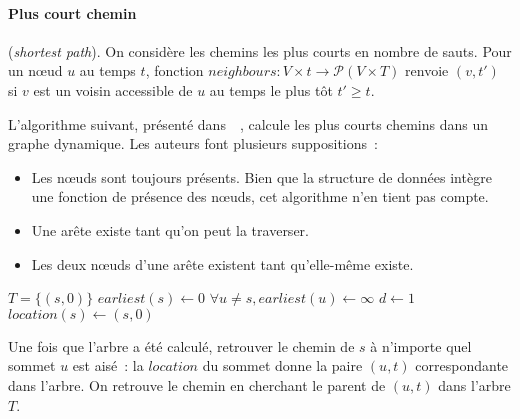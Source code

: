 \documentclass[12pt,a4paper]{article}
\begin{document}
\paragraph{Plus court chemin}
(\textit{shortest path}). On considère les chemins les plus courts en
nombre de sauts. Pour un nœud \(u\) au temps \(t\), fonction
\(neighbours : V \times t \to \mathcal{P}(V \times T)\) renvoie
\((v, t')\) si \(v\) est un voisin accessible de \(u\) au temps le
plus tôt \(t' \geq t\).

L'algorithme suivant, présenté dans~~\cite{xuan2003computing}, calcule
les plus courts chemins dans un graphe dynamique. Les auteurs font
plusieurs suppositions~:
\begin{itemize}
\item Les nœuds sont toujours présents. Bien que la structure de
  données intègre une fonction de présence des nœuds, cet algorithme
  n'en tient pas compte.
\item Une arête existe tant qu'on peut la traverser.
\item Les deux nœuds d'une arête existent tant qu'elle-même existe.
\end{itemize}

\begin{algorithm}[H]
  \(T = \{(s, 0)\}\)\;
  \(earliest(s) \leftarrow 0\)\;
  \(\forall u \neq s, earliest(u) \leftarrow \infty\)\;
  \(d \leftarrow 1\)\;
  \(location(s) \leftarrow (s, 0)\)\;
\end{algorithm}

Une fois que l'arbre a été calculé, retrouver le chemin de \(s\) à
n'importe quel sommet \(u\) est aisé~: la \(location\) du sommet donne
la paire \((u, t)\) correspondante dans l'arbre. On retrouve le chemin
en cherchant le parent de \((u, t)\) dans l'arbre \(T\).
\end{document}
